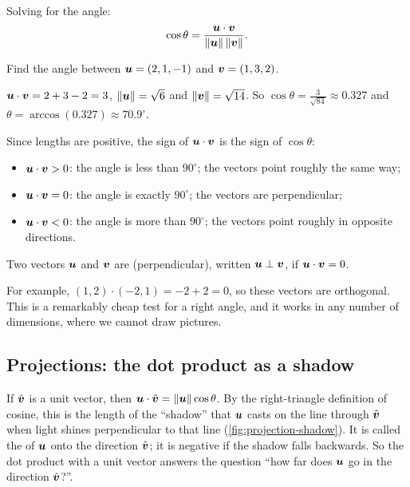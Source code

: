 Solving for the angle:
\[
  \cos\theta = \frac{\bm{u}\cdot\bm{v}}{\lVert\bm{u}\rVert\,\lVert\bm{v}\rVert} .
\]

\begin{example}\label{ex:angle-vectors}
Find the angle between $\bm{u} = (2, 1, -1)$ and $\bm{v} = (1, 3, 2)$.

\sol $\bm{u}\cdot\bm{v} = 2 + 3 - 2 = 3$, $\lVert\bm{u}\rVert = \sqrt{6}$ and
$\lVert\bm{v}\rVert = \sqrt{14}$. So $\cos\theta = \frac{3}{\sqrt{84}} \approx 0.327$
and $\theta = \arccos(0.327) \approx 70.9^\circ$.
\end{example}

\begin{intuition}
Since lengths are positive, the sign of $\bm{u}\cdot\bm{v}$ is the sign of
$\cos\theta$:
\begin{itemize}
  \item $\bm{u}\cdot\bm{v} > 0$: the angle is less than $90^\circ$; the vectors point
    roughly the same way;
  \item $\bm{u}\cdot\bm{v} = 0$: the angle is exactly $90^\circ$; the vectors are
    perpendicular;
  \item $\bm{u}\cdot\bm{v} < 0$: the angle is more than $90^\circ$; the vectors point
    roughly in opposite directions.
\end{itemize}
\end{intuition}

\begin{definition}\label{def:orthogonal}
Two vectors $\bm{u}$ and $\bm{v}$ are  (perpendicular), written
$\bm{u} \perp \bm{v}$, if $\bm{u}\cdot\bm{v} = 0$.
\end{definition}

For example, $(1, 2)\cdot(-2, 1) = -2 + 2 = 0$, so these vectors are
orthogonal. This is a remarkably cheap test for a right angle, and it works in
any number of dimensions, where we cannot draw pictures.

\subsection{Projections: the dot product as a shadow}

If $\hat{\bm{v}}$ is a unit vector, then $\bm{u}\cdot\hat{\bm{v}} = \lVert\bm{u}\rVert\cos\theta$.
By the right-triangle definition of cosine, this is the length of the
``shadow'' that $\bm{u}$ casts on the line through $\hat{\bm{v}}$ when light shines
perpendicular to that line (\cref{fig:projection-shadow}). It is called the
 of $\bm{u}$ onto the direction $\hat{\bm{v}}$; it is negative
if the shadow falls backwards. So the dot product with a unit vector answers
the question ``how far does $\bm{u}$ go in the direction $\hat{\bm{v}}$?''.

